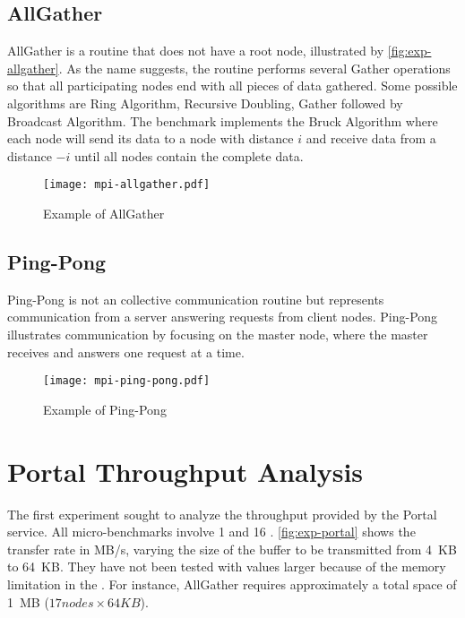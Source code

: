 		\subsection{AllGather}

			AllGather is a routine that does not have a root node, illustrated by
			\autoref{fig:exp-allgather}. As the name suggests, the routine performs
			several Gather operations so that all participating nodes end with all
			pieces of data gathered. Some possible algorithms are Ring Algorithm,
			Recursive Doubling, Gather followed by Broadcast Algorithm. The benchmark
			implements the Bruck Algorithm where each node will send its data to a node
			with distance $i$ and receive data from a distance $-i$ until all nodes
			contain the complete data.

			\begin{figure}[!tb]
				\centering%
				\caption{Example of \mpi AllGather}%
				\label{fig:exp-allgather}%
				\texttt{[image: mpi-allgather.pdf]}%
			\end{figure}

		\subsection{Ping-Pong}

			Ping-Pong is not an \mpi collective communication routine but represents
			communication from a server answering requests from client nodes.
			Ping-Pong illustrates communication by focusing on the master node,
			where the master receives and answers one request at a time.

			\begin{figure}[!tb]
			    \centering%
			    \caption{Example of Ping-Pong}%
			    \label{fig:exp-ping-pong}%
			    \texttt{[image: mpi-ping-pong.pdf]}%
			\end{figure}

	\section{Portal Throughput Analysis}

		The first experiment sought to analyze the throughput provided by the
		Portal service. All micro-benchmarks involve 1 \iocluster and 16 \ccluters.
		\autoref{fig:exp-portal} shows the transfer rate in MB/s, varying the size
		of the buffer to be transmitted from 4~KB to 64~KB. They have not been
		tested with values ​​larger because of the memory limitation in the \ccluters.
		For instance, AllGather requires approximately a total space of 1~MB ($17 nodes \times 64 KB$).

